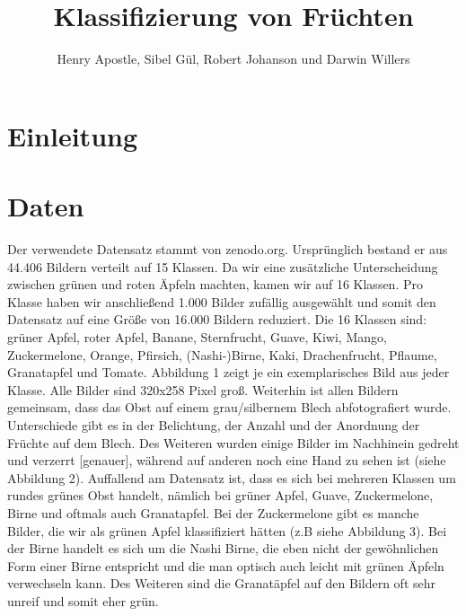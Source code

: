 \documentclass[a4,german]{article}
\begin{document}
\title{Klassifizierung von Früchten}
\author{Henry Apostle, Sibel Gül, Robert Johanson und Darwin Willers}

\maketitle %


\begin{abstract}

\end{abstract}

\section{Einleitung}

\section{Daten}
Der verwendete Datensatz stammt von zenodo.org. Ursprünglich bestand er aus 44.406 Bildern verteilt auf 15 Klassen. Da wir eine zusätzliche Unterscheidung zwischen grünen und roten Äpfeln machten, kamen wir auf 16 Klassen. Pro Klasse haben wir anschließend 1.000 Bilder zufällig ausgewählt und somit den Datensatz auf eine Größe von 16.000 Bildern reduziert. Die 16 Klassen sind: grüner Apfel, roter Apfel, Banane, Sternfrucht, Guave, Kiwi, Mango, Zuckermelone, Orange, Pfirsich, (Nashi-)Birne, Kaki, Drachenfrucht, Pflaume, Granatapfel und Tomate. Abbildung 1 zeigt je ein exemplarisches Bild aus jeder Klasse. Alle Bilder sind 320x258 Pixel groß. Weiterhin ist allen Bildern gemeinsam, dass das Obst auf einem grau/silbernem Blech abfotografiert wurde. Unterschiede gibt es in der Belichtung, der Anzahl und der Anordnung der Früchte auf dem Blech. Des Weiteren wurden einige Bilder im Nachhinein gedreht und verzerrt [genauer], während auf anderen noch eine Hand zu sehen ist (siehe Abbildung 2). Auffallend am Datensatz ist, dass es sich bei mehreren Klassen um rundes grünes Obst handelt, nämlich bei grüner Apfel, Guave, Zuckermelone, Birne und oftmals auch Granatapfel. Bei der Zuckermelone gibt es manche Bilder, die wir als grünen Apfel klassifiziert hätten (z.B siehe Abbildung 3). Bei der Birne handelt es sich um die Nashi Birne, die eben nicht der gewöhnlichen Form einer Birne entspricht und die man optisch auch leicht mit grünen Äpfeln verwechseln kann. Des Weiteren sind die Granatäpfel auf den Bildern oft sehr unreif und somit eher grün. 
\end{document}
